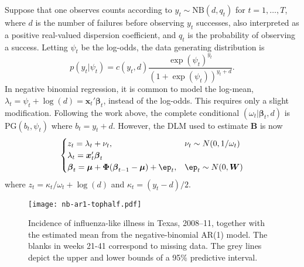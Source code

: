 \documentclass[12pt]{article}
\newcommand{\PG}{\text{PG}}
\newcommand{\NB}{\text{NB}}
\newcommand{\bbeta}{\boldsymbol{\beta}}
\newcommand{\vx}{\boldsymbol{x}}
\newcommand{\betap}{{\boldsymbol{B}}}
\newcommand{\bW}{\boldsymbol{W}}
\newcommand{\bPhi}{\boldsymbol{\Phi}}
\newcommand{\bmu}{\boldsymbol{\mu}}
\newcommand{\vep}{\boldsymbol{\ep}}
\begin{document}
\begin{example}
  Suppose that one observes counts according to $y_t \sim \NB(d, q_t)$ for
  $t=1, \ldots, T$, where $d$ is the number of failures before observing $y_t$
  successes, also interpreted as a positive real-valued dispersion coefficient,
  and $q_t$ is the probability of observing a success.  Letting $\psi_t$ be the
  log-odds, the data generating distribution is
  \[
  p(y_t | \psi_t) = c(y_t, d) \frac{\exp({\psi_t})^{y_t}}{(1+\exp({\psi_t}))^{y_t+d}}.
  \]
  In negative binomial regression, it is common to model the log-mean, $\lambda_t
  = \psi_t + \log(d) = \vx_t' \bbeta_t$, instead of the log-odds.  This requires only
  a slight modification.  Following the work above, the complete conditional
  $(\omega_t | \bbeta_t, d)$ is $\PG(b_t, \psi_t)$ where $b_t = y_t + d$.  However,
  the DLM used to estimate $\betap$ is now
  \[
  \begin{cases}
    z_t = \lambda_t + \nu_t, & \nu_t \sim N(0, 1/\omega_t) \\
    \lambda_t = \vx_t' \bbeta_t \\
    \bbeta_t = \bmu + \bPhi (\bbeta_{t-1} - \bmu) + \vep_t, & \vep_t \sim N(0, \bW)
  \end{cases}
  \]
  where $z_t = \kappa_t / \omega_t + \log(d)$ and $\kappa_t = (y_t - d) / 2$.
\end{example}



\begin{figure}
  \begin{center}
    \texttt{[image: nb-ar1-tophalf.pdf]}
    \caption{\label{fig:nb-ar1} Incidence of influenza-like illness in Texas,
      2008--11, together with the estimated mean from the negative-binomial AR(1)
      model.  The blanks in weeks 21-41 correspond to missing data.  The grey lines
      depict the upper and lower bounds of a 95$\%$ predictive interval.}
  \end{center}
\end{figure}
\end{document}
